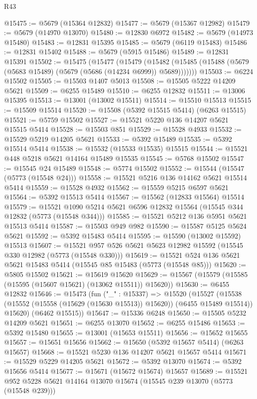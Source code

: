 \begin{lexlean}{R43}
\begin{coremodule}
@15475 := @5679 (@15364 @12832)
@15477 := @5679 (@15367 @12982)
@15479 := @5679 (@14970 @13070)
@15480 := @12830 @6972
@15482 := @5679 (@14973 @15480)
@15483 := @12831 @15395
@15485 := @5679 (@6119 @15483)
@15486 := @12831 @15402
@15488 := @5679 (@5915 @15486)
@15489 := @12831 @15391
@15502 := @15475
    (@15477
      (@15479
        (@15482 (@15485 (@15488 (@5679 (@5683 @15489) (@5679 (@5686 (@14234 @6999)) @5689)))))))
@15503 := @6224 @15502
@15505 := @15503 @1407 @5013
@15508 := @15505 @5222 @14209 @5621
@15509 := @6255 @15489
@15510 := @6255 @12832
@15511 := @13006 @15395
@15513 := @13001 (@13002 @15511)
@15514 := @15510 @15513
@15515 := @15509 @15514
@15520 := @15508 (@5392 @15515 @5414) (@6263 @15515)
@15521 := @5759 @15502
@15527 := @15521 @5220 @136 @14207 @5621 @15515 @5414
@15528 := @15503 @851
@15529 := @15528 @4933
@15532 := @15529 @5219 @14205 @5621
@15533 := @5392 @15489
@15535 := @5392 @15514 @5414
@15538 := @15532 (@15533 @15535) @15515
@15544 := @15521 @448 @5218 @5621 @14164 @15489 @15535
@15545 := @5768 @15502
@15547 := @15545 @24 @15489
@15548 := @5774 @15502
@15552 := @15544 (@15547 (@5773 (@15548 @24)))
@15558 := @15521 @5216 @136 @14162 @5621 @15514 @5414
@15559 := @15528 @4932
@15562 := @15559 @5215 @6597 @5621
@15564 := @5392 @15513 @5414
@15567 := @15562 (@12833 @15564) @15514
@15579 := @15521 @1090 @5214 @5621 @6596 @12832 @15564 (@15545 @344 @12832 (@5773 (@15548 @344)))
@15585 := @15521 @5212 @136 @5951 @5621 @15513 @5414
@15587 := @15503 @949 @982
@15590 := @15587 @5125 @5624 @5621
@15592 := @5392 @15483 @5414
@15595 := @15590 (@13002 @15592) @15513
@15607 := @15521 @957 @526 @5621 @5623 @12982 @15592 (@15545 @330 @12982 (@5773 (@15548 @330)))
@15619 := @15521 @524 @136 @5621 @5621 @15483 @5414 (@15545 @85 @15483 (@5773 (@15548 @85)))
@15620 := @5805 @15502
@15621 := @15619 @15620
@15629 := @15567 (@15579 (@15585 (@15595 (@15607 @15621) (@13062 @15511)) @15620))
@15630 := @6455 @12832
@15646 := @15473
    (fun ("_" : @15337) =>
    @15520
      (@15527
        (@15538 (@15552 (@15558 (@15629 (@15630 @15513)) @15620)) (@6455 @15489 @15514))
        @15620)
      (@6462 @15515))
@15647 := @15336 @6248
@15650 := @15505 @5232 @14209 @5621
@15651 := @6255 @13070
@15652 := @6255 @15486
@15653 := @5392 @15480
@15655 := @13001 (@15653 @15511)
@15656 := @15652 @15655
@15657 := @15651 @15656
@15662 := @15650 (@5392 @15657 @5414) (@6263 @15657)
@15668 := @15521 @5230 @136 @14207 @5621 @15657 @5414
@15671 := @15529 @5229 @14205 @5621
@15672 := @5392 @13070
@15674 := @5392 @15656 @5414
@15677 := @15671 (@15672 @15674) @15657
@15689 := @15521 @952 @5228 @5621 @14164 @13070 @15674 (@15545 @239 @13070 (@5773 (@15548 @239)))

\end{coremodule}
\end{lexlean}
